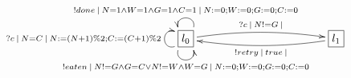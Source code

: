 $\xymatrix{
   \fbox{$l_0$} \ar@(ld,lu)[]^{?c\:|\:N=C\:|\:N:=(N+1)\%2;C:=(C+1)\%2} \ar@(dl,dr)[]_{!eaten\:|\:N!=G\land G=C\lor N!=W\land W=G\:|\:N:=0;W:=0;G:=0;C:=0} \ar@(ur,ul)[]_{!done\:|\:N=1\land W=1\land G=1\land C=1\:|\:N:=0;W:=0;G:=0;C:=0} \ar@/^/[rrrr]^{?c\:|\:N!=G\:|} &&&& \fbox{$l_1$} \ar@/^/[llll]^{!retry\:|\:true\:|}
}$
